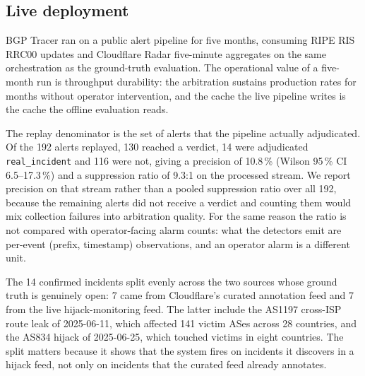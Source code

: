 \subsection{Live deployment}
\label{sec:eval-live}

BGP Tracer ran on a public alert pipeline for five months, consuming RIPE
RIS RRC00 updates and Cloudflare Radar five-minute aggregates on the same
orchestration as the ground-truth evaluation. The operational value of a
five-month run is throughput durability: the arbitration sustains production
rates for months without operator intervention, and the cache the live
pipeline writes is the cache the offline evaluation reads.

The replay denominator is the set of alerts that the pipeline actually
adjudicated. Of the 192 alerts replayed, 130 reached a verdict, 14 were
adjudicated \texttt{real\_incident} and 116 were not, giving a precision of
10.8\,\% (Wilson 95\,\% CI 6.5--17.3\,\%) and a suppression ratio of 9.3:1
on the processed stream. We report precision on that stream rather than a
pooled suppression ratio over all 192, because the remaining alerts did not
receive a verdict and counting them would mix collection failures into
arbitration quality. For the same reason the ratio is not compared with
operator-facing alarm counts: what the detectors emit are per-event (prefix,
timestamp) observations, and an operator alarm is a different unit.

The 14 confirmed incidents split evenly across the two sources whose ground
truth is genuinely open: 7 came from Cloudflare's curated annotation feed and
7 from the live hijack-monitoring feed. The latter include the AS1197
cross-ISP route leak of 2025-06-11, which affected 141 victim ASes across 28
countries, and the AS834 hijack of 2025-06-25, which touched victims in
eight countries. The split matters because it shows that the system fires on
incidents it discovers in a hijack feed, not only on incidents that the
curated feed already annotates.
